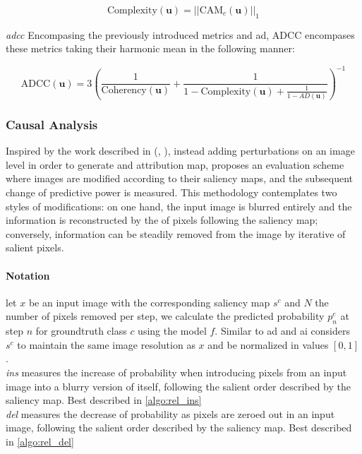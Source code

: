 \begin{equation}
	\mbox{Complexity}(\mathbf{u}) = ||\mbox{CAM}_c(\mathbf{u})||_1
\end{equation}

\emph{\gls{adcc}} Encompasing the previously introduced metrics and \gls{ad}, ADCC encompases 
these metrics taking their harmonic mean in the following manner:

\begin{equation}
	\mbox{ADCC}(\mathbf{u}) = 3\left(\frac{1}{\mbox{Coherency}(\mathbf{u})} + 
	                           \frac{1}{1-\mbox{Complexity}(\mathbf{u}) + 
							   \frac{1}{1-AD(\mathbf{u})}}\right)^{-1}
\end{equation}
\subsubsection{Causal Analysis} 
\label{sec:causal_metrics}
Inspired by the work described in (\cite{fong2017interpretable}, 
\cite{fong2019understanding}), instead adding perturbations on an image level in order to generate 
and attribution map, \cite{petsiuk2018rise} proposes an evaluation scheme where images are modified 
according to their saliency maps, and the subsequent change of predictive power is measured. This 
methodology contemplates two styles of modifications: on one hand, the input image is blurred 
entirely and the information is reconstructed by the  of pixels following the 
saliency map; conversely, information can be steadily removed from the image by iterative
 of salient pixels.\\

\paragraph{Notation} let $x$ be an input image with the corresponding saliency map $s^c$ and $N$ the 
number of pixels removed per step, we calculate the predicted probability $p^c_n$ at step $n$ for 
groundtruth class $c$ using the model $f$.  Similar to \gls{ad} and \gls{ai} \cite{petsiuk2018rise} 
considers $s^c$ to maintain the same image resolution as $x$ and be normalized in values $[0,1]$.\\

\emph{\gls{ins}} measures the increase of probability when introducing pixels from an input image 
into a blurry version of itself, following the salient order described by the saliency map. Best 
described in \autoref{algo:rel_ins}\\

\emph{\gls{del}} measures the decrease of probability as pixels are zeroed out in an input image, 
following the salient order described by the saliency map. Best 
described in \autoref{algo:rel_del}\\

